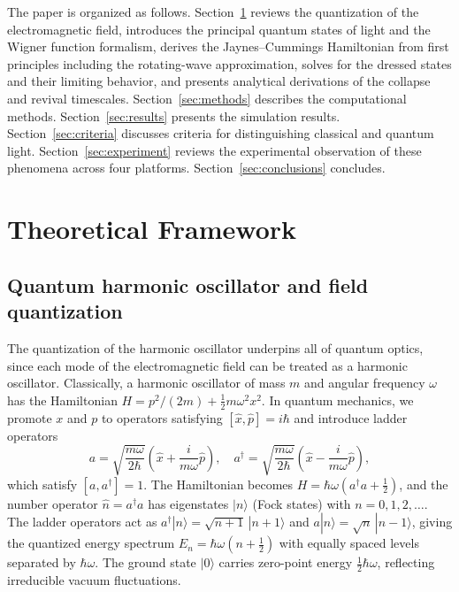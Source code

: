 \documentclass[12pt]{iopart}
\begin{document}
The paper is organized as follows. Section~\ref{sec:theory} reviews the quantization of the electromagnetic field, introduces the principal quantum states of light and the Wigner function formalism, derives the Jaynes--Cummings Hamiltonian from first principles including the rotating-wave approximation, solves for the dressed states and their limiting behavior, and presents analytical derivations of the collapse and revival timescales. Section~\ref{sec:methods} describes the computational methods. Section~\ref{sec:results} presents the simulation results. Section~\ref{sec:criteria} discusses criteria for distinguishing classical and quantum light. Section~\ref{sec:experiment} reviews the experimental observation of these phenomena across four platforms. Section~\ref{sec:conclusions} concludes.


\section{Theoretical Framework}
\label{sec:theory}

\subsection{Quantum harmonic oscillator and field quantization}
\label{sec:quantization}

The quantization of the harmonic oscillator underpins all of quantum optics, since each mode of the electromagnetic field can be treated as a harmonic oscillator. Classically, a harmonic oscillator of mass $m$ and angular frequency $\omega$ has the Hamiltonian $H = p^2/(2m) + \tfrac{1}{2}m\omega^2 x^2$. In quantum mechanics, we promote $x$ and $p$ to operators satisfying $[\hat{x}, \hat{p}] = i\hbar$ and introduce ladder operators
\begin{equation}
a = \sqrt{\frac{m\omega}{2\hbar}} \left( \hat{x} + \frac{i}{m\omega} \hat{p} \right), \quad
a^\dagger = \sqrt{\frac{m\omega}{2\hbar}} \left( \hat{x} - \frac{i}{m\omega} \hat{p} \right),
\label{eq:ladder}
\end{equation}
which satisfy $[a, a^\dagger] = 1$. The Hamiltonian becomes $H = \hbar\omega(a^\dagger a + \tfrac{1}{2})$, and the number operator $\hat{n} = a^\dagger a$ has eigenstates $|n\rangle$ (Fock states) with $n = 0, 1, 2, \ldots$. The ladder operators act as $a^\dagger|n\rangle = \sqrt{n+1}\,|n+1\rangle$ and $a|n\rangle = \sqrt{n}\,|n-1\rangle$, giving the quantized energy spectrum $E_n = \hbar\omega(n + \tfrac{1}{2})$ with equally spaced levels separated by $\hbar\omega$. The ground state $|0\rangle$ carries zero-point energy $\tfrac{1}{2}\hbar\omega$, reflecting irreducible vacuum fluctuations.
\end{document}
